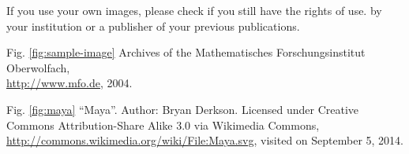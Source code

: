 \documentclass{snapshotmfo}
\begin{document}
If you use your own images, please check if you still have the rights of use.  by your institution or a publisher of your previous publications.

\clearpage

\begin{imagecredits}
  \item[Fig. \ref{fig:sample-image}] Archives of the Mathematisches Forschungsinstitut Oberwolfach,\\\url{http://www.mfo.de}, 2004.
  \item[Fig. \ref{fig:maya}] ``Maya''. Author: Bryan Derkson. Licensed under Creative Commons Attribution-Share Alike 3.0 via Wikimedia Commons, \url{http://commons.wikimedia.org/wiki/File:Maya.svg}, visited on September 5, 2014.
\end{imagecredits}


\end{document}
